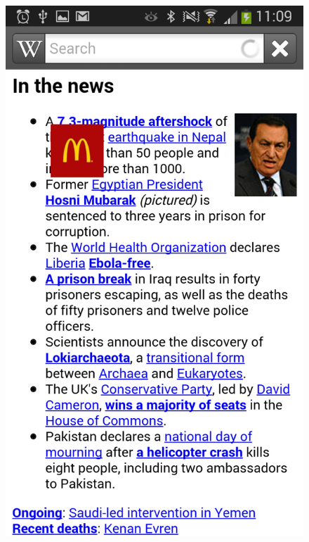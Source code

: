 \begin{figure}
\begin{center}
\includegraphics[scale=0.25]{Images/gesturead_small1.png}

\end{center}
\end{figure}
